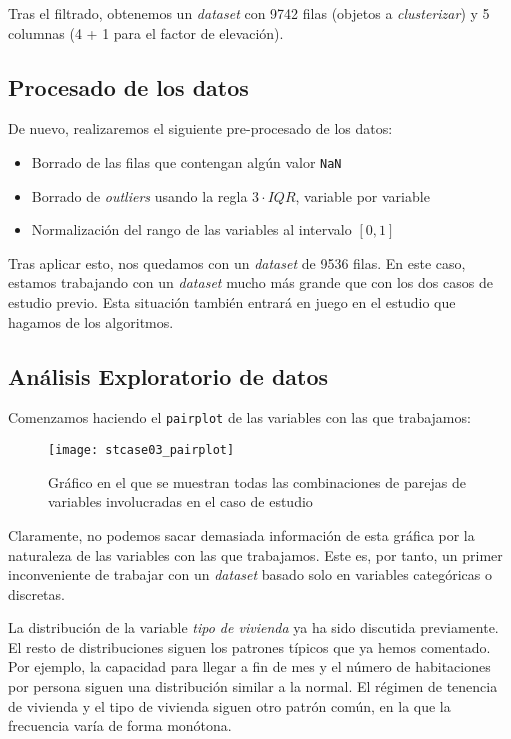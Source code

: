 \documentclass[11pt]{article}
\begin{document}
Tras el filtrado, obtenemos un \emph{dataset} con 9742 filas (objetos a \emph{clusterizar}) y 5 columnas (4 + 1 para el factor de elevación).

\pagebreak

\subsection{Procesado de los datos}

De nuevo, realizaremos el siguiente pre-procesado de los datos:

\begin{itemize}
    \item Borrado de las filas que contengan algún valor \lstinline{NaN}
    \item Borrado de \emph{outliers} usando la regla $3 \cdot IQR$, variable por variable
    \item Normalización del rango de las variables al intervalo $[0, 1]$
\end{itemize}

Tras aplicar esto, nos quedamos con un \emph{dataset} de 9536 filas. En este caso, estamos trabajando con un \emph{dataset} mucho más grande que con los dos casos de estudio previo. Esta situación también entrará en juego en el estudio que hagamos de los algoritmos.

\pagebreak

\subsection{Análisis Exploratorio de datos}

Comenzamos haciendo el \lstinline{pairplot} de las variables con las que trabajamos:

\begin{figure}[H]
    \centering

    \texttt{[image: stcase03\_pairplot]}
    \caption{Gráfico en el que se muestran todas las combinaciones de parejas de variables involucradas en el caso de estudio}
    \label{stcase01_pairplot:figura}
\end{figure}

Claramente, no podemos sacar demasiada información de esta gráfica por la naturaleza de las variables con las que trabajamos. Este es, por tanto, un primer inconveniente de trabajar con un \emph{dataset} basado solo en variables categóricas o discretas.

La distribución de la variable \emph{tipo de vivienda} ya ha sido discutida previamente. El resto de distribuciones siguen los patrones típicos que ya hemos comentado. Por ejemplo, la capacidad para llegar a fin de mes y el número de habitaciones por persona siguen una distribución similar a la normal. El régimen de tenencia de vivienda y el tipo de vivienda siguen otro patrón común, en la que la frecuencia varía de forma monótona.
\end{document}
